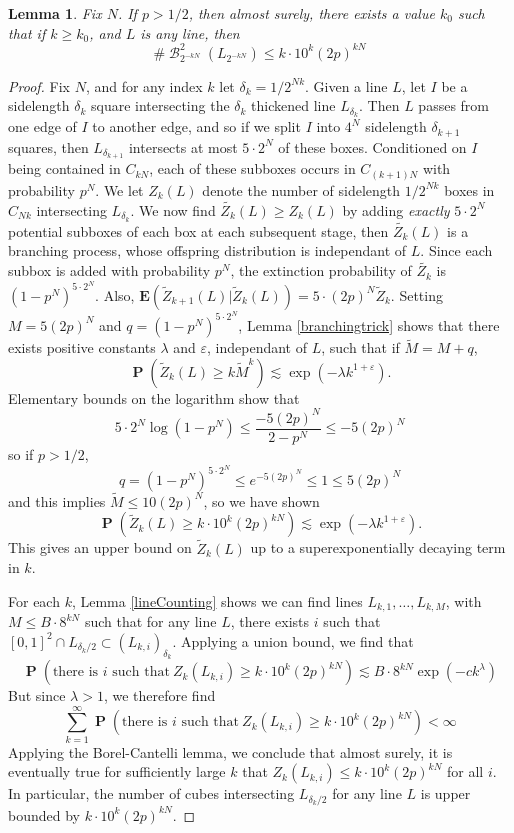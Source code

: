 \documentclass[dvipsnames,letterpaper,12pt]{article}
\numberwithin{equation}{section}
\theoremstyle{plain}
\newtheorem{lemma}{Lemma}
\theoremstyle{remark}
\DeclareMathOperator{\Prob}{\mathbf{P}}
\DeclareMathOperator{\B}{\mathcal{B}}
\begin{document}
\begin{lemma} \label{lineBounding}
	Fix $N$. If $p > 1/2$, then almost surely, there exists a value $k_0$ such that if $k \geq k_0$, and $L$ is any line, then
	\[ \# \B^2_{2^{-kN}}(L_{2^{-kN}}) \leq k \cdot 10^k (2p)^{kN} \]
\end{lemma}
\begin{proof}
	Fix $N$, and for any index $k$ let $\delta_k = 1/2^{Nk}$. Given a line $L$, let $I$ be a sidelength $\delta_k$ square intersecting the $\delta_k$ thickened line $L_{\delta_k}$. Then $L$ passes from one edge of $I$ to another edge, and so if we split $I$ into $4^N$ sidelength $\delta_{k+1}$ squares, then $L_{\delta_{k+1}}$ intersects at most $5 \cdot 2^N$ of these boxes. Conditioned on $I$ being contained in $C_{kN}$, each of these subboxes occurs in $C_{(k+1)N}$ with probability $p^N$. We let $Z_k(L)$ denote the number of sidelength $1/2^{Nk}$ boxes in $C_{Nk}$ intersecting $L_{\delta_k}$. We now find $\tilde{Z_k}(L) \geq Z_k(L)$ by adding {\it exactly} $5 \cdot 2^N$ potential subboxes of each box at each subsequent stage, then $\tilde{Z_k}(L)$ is a branching process, whose offspring distribution is independant of $L$. Since each subbox is added with probability $p^N$, the extinction probability of $\tilde{Z_k}$ is $(1 - p^N)^{5 \cdot 2^N}$. Also, $\mathbf{E}(\tilde{Z}_{k+1}(L)|\tilde{Z}_k(L)) = 5 \cdot (2p)^N \tilde{Z}_k$.  Setting $M = 5 (2p)^N$ and $q = (1 - p^N)^{5 \cdot 2^N}$, Lemma \ref{branchingtrick} shows that there exists positive constants $\lambda$ and $\varepsilon$, independant of $L$, such that if $\tilde{M} = M + q$,
	\[ \Prob \left( \tilde{Z}_k(L) \geq k \tilde{M}^k \right) \lesssim \exp(- \lambda k^{1 + \varepsilon}). \]
	Elementary bounds on the logarithm show that
	\[ 5 \cdot 2^N \log(1 - p^N) \leq \frac{-5 (2p)^N}{2 - p^N} \leq -5(2p)^N \]
	so if $p > 1/2$,
	\[ q = (1 - p^N)^{5 \cdot 2^N} \leq e^{-5 (2p)^N} \leq 1 \leq 5(2p)^N \]
	and this implies $\tilde{M} \leq 10 (2p)^N$, so we have shown
	\[ \Prob ( \tilde{Z}_k(L) \geq k \cdot 10^k (2p)^{kN}) \lesssim \exp( - \lambda k^{1 + \varepsilon}). \]
	This gives an upper bound on $\tilde{Z}_k(L)$ up to a superexponentially decaying term in $k$.

	For each $k$, Lemma \ref{lineCounting} shows we can find lines $L_{k,1}, \dots, L_{k,M}$, with $M \leq B \cdot 8^{kN}$ such that for any line $L$, there exists $i$ such that $[0,1]^2 \cap L_{\delta_k/2} \subset (L_{k,i})_{\delta_k}$. Applying a union bound, we find that
	\[ \Prob \left( \text{there is $i$ such that}\ Z_k(L_{k,i}) \geq k \cdot 10^k (2p)^{kN} \right) \lesssim B \cdot 8^{kN} \exp(-c k^\lambda) \]
	But since $\lambda > 1$, we therefore find
	\[ \sum_{k = 1}^\infty \Prob \left( \text{there is $i$ such that}\ Z_k(L_{k,i}) \geq k \cdot 10^k (2p)^{kN} \right) < \infty \]
	Applying the Borel-Cantelli lemma, we conclude that almost surely, it is eventually true for sufficiently large $k$ that $Z_k(L_{k,i}) \leq k \cdot 10^k (2p)^{kN}$ for all $i$. In particular, the number of cubes intersecting $L_{\delta_k/2}$ for any line $L$ is upper bounded by $k \cdot 10^k (2p)^{kN}$.
\end{proof}
\end{document}
